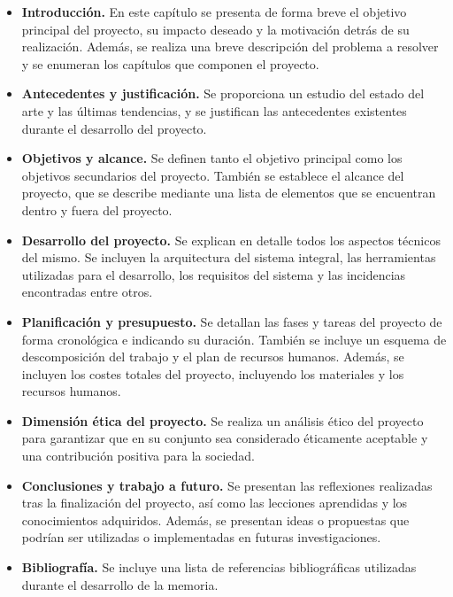 \begin{itemize}
    \item \textbf{Introducción.} En este capítulo se presenta de forma breve el objetivo 
    principal del proyecto, su impacto deseado y la motivación detrás de su realización. 
    Además, se realiza una  breve descripción del problema a resolver y se enumeran
    los capítulos que componen el proyecto.
    \item \textbf{Antecedentes y justificación.} Se proporciona un estudio del estado del 
    arte y las últimas tendencias, y se justifican las antecedentes existentes durante el 
    desarrollo del proyecto.
    \item \textbf{Objetivos y alcance.} Se definen tanto el objetivo 
    principal como los objetivos secundarios del proyecto. También se establece el alcance 
    del proyecto, que se describe mediante una lista de elementos que se encuentran 
    dentro y fuera del proyecto.
    \item \textbf{Desarrollo del proyecto.} Se explican en detalle todos los aspectos técnicos del mismo. 
    Se incluyen la arquitectura del sistema integral, las herramientas utilizadas para el desarrollo, 
    los requisitos del sistema y las incidencias encontradas entre otros.
    \item \textbf{Planificación y presupuesto.} Se detallan las fases y tareas del proyecto de forma
    cronológica e indicando su duración. También se incluye un esquema de descomposición 
    del trabajo y el plan de recursos humanos. Además, se incluyen los costes totales del proyecto, 
    incluyendo los materiales y los recursos humanos.
    \item \textbf{Dimensión ética del proyecto.} Se realiza un análisis ético del proyecto 
    para garantizar que en su conjunto sea considerado éticamente aceptable y una contribución positiva 
    para la sociedad.
    \item \textbf{Conclusiones y trabajo a futuro.} Se presentan las reflexiones realizadas 
    tras la finalización del proyecto, así como las lecciones aprendidas y los conocimientos 
    adquiridos. Además, se presentan ideas o propuestas que podrían ser utilizadas o implementadas 
    en futuras investigaciones.
    \item \textbf{Bibliografía.} Se incluye una lista de referencias bibliográficas utilizadas
    durante el desarrollo de la memoria.

\end{itemize}



\pagebreak